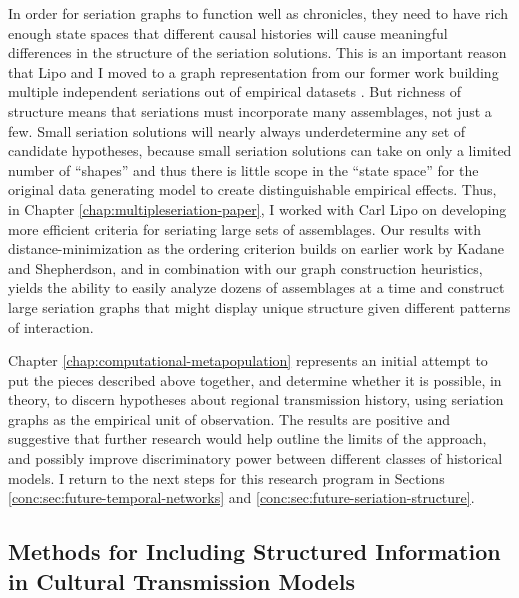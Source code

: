 In order for seriation graphs to function well as chronicles, they need to have rich enough state spaces that different causal histories will cause meaningful differences in the structure of the seriation solutions.  This is an important reason that Lipo and I moved to a graph representation from our former work building multiple independent seriations out of empirical datasets \citep{Lipo2015}.  But richness of structure means that seriations must incorporate many assemblages, not just a few.  Small seriation solutions will nearly always underdetermine any set of candidate hypotheses, because small seriation solutions can take on only a limited number of ``shapes'' and thus there is little scope in the ``state space'' for the original data generating model to create distinguishable empirical effects.  Thus, in Chapter \ref{chap:multipleseriation-paper}, I worked with Carl Lipo on developing more efficient criteria for seriating large sets of assemblages.  Our results with distance-minimization as the ordering criterion builds on earlier work by Kadane and Shepherdson, and in combination with our graph construction heuristics, yields the ability to easily analyze dozens of assemblages at a time and construct large seriation graphs that might display unique structure given different patterns of interaction.

Chapter \ref{chap:computational-metapopulation} represents an initial attempt to put the pieces described above together, and determine whether it is possible, in theory, to discern hypotheses about regional transmission history, using seriation graphs as the empirical unit of observation.  The results are positive and suggestive that further research would help outline the limits of the approach, and possibly improve discriminatory power between different classes of historical models.  I return to the next steps for this research program in Sections \ref{conc:sec:future-temporal-networks} and \ref{conc:sec:future-seriation-structure}.   

\subsection{Methods for Including Structured Information in Cultural Transmission Models}\label{conc:sec:conc-structured}

